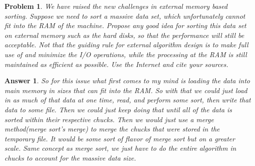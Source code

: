 \documentclass[11pt]{article}
\newtheorem{problem}{Problem}
\newtheorem{answer}{Answer}
\begin{document}
\bigskip

\begin{problem}
\label{prob:6}
 We have raised the new challenges in external memory based sorting. Suppose we need to sort a massive data set, which unfortunately cannot fit into the RAM of the machine. Propose any good idea for sorting this data set on external memory such as the hard disks, so that the performance will still be acceptable. Not that the guiding rule for external algorithm design is to make full use of and minimize the I/O operations, while the processing at the RAM is still maintained as efficient as possible. Use the Internet and cite your sources.
\end{problem}

\begin{answer}
\label{ans:6}
 So for this issue what first comes to my mind is loading the data into main memory in sizes that can fit into the RAM. So with that we could just load in as much of that data at one time, read, and perform some sort, then write that data to some
 file. Then we could just keep doing that until all of the data is sorted within their respective chucks. Then we would just use a merge method(merge sort's merge) to merge the chucks that were stored in the temporary file. It would be some sort of flavor of merge sort but on a greater scale. Same concept as merge sort, we just have to do the entire algorithm in chucks to account for the massive data size.
\end{answer}
\end{document}

